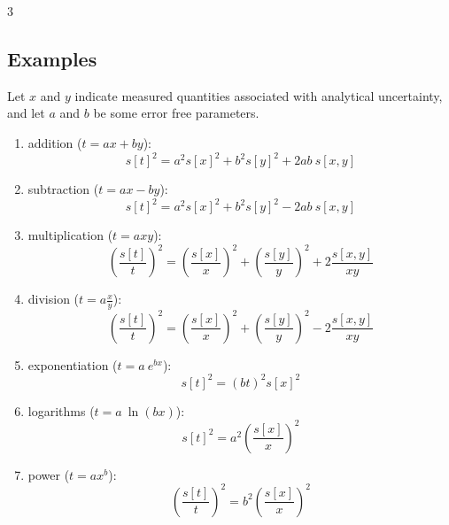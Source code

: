 \documentclass{article}
\begin{document}
\begin{multicols}{3}
\subsection{Examples}

Let $x$ and $y$ indicate measured quantities associated with
analytical uncertainty, and let $a$ and $b$ be some error free
parameters.
\begin{enumerate}
\item{addition ($t = a x + b y$):}
\begin{equation}
  s[t]^2 = a^2 s[x]^2 + b^2 s[y]^2 + 2ab~s[x,y]
  \label{eq:addition}
\end{equation}

\item{subtraction ($t = a x - b y$):}
\begin{equation}
s[t]^2 = a^2 s[x]^2 + b^2 s[y]^2 - 2ab~s[x,y]
\label{eq:subtraction}
\end{equation}

\item{multiplication ($t = a x y$):}
\begin{equation}
\left(\frac{s[t]}{t}\right)^2 = \left(\frac{s[x]}{x}\right)^2 + 
  \left(\frac{s[y]}{y}\right)^2 + 2 \frac{s[x,y]}{x y}
\label{eq:multiplication}
\end{equation}

\item{division ($t = a \frac{x}{y}$):}
\begin{equation}
  \left(\frac{s[t]}{t}\right)^2 = \left(\frac{s[x]}{x}\right)^2 + 
  \left(\frac{s[y]}{y}\right)^2 - 2 \frac{s[x,y]}{x y}
\label{eq:division}
\end{equation}

\item{exponentiation ($t = a~e^{bx}$):}
\begin{equation}
s[t]^2 = (b t)^2 s[x]^2
\label{eq:exponentiation}
\end{equation}

\item{logarithms ($t = a~\ln(bx)$):}
\begin{equation}
s[t]^2 = a^2 \left(\frac{s[x]}{x}\right)^2
\label{eq:logarithms}
\end{equation}

\item{power ($t = a x^b$):}
\begin{equation}
\left(\frac{s[t]}{t}\right)^2 = b^2\left(\frac{s[x]}{x}\right)^2
\label{eq:power}
\end{equation}


\end{enumerate}
\end{multicols}
\end{document}
